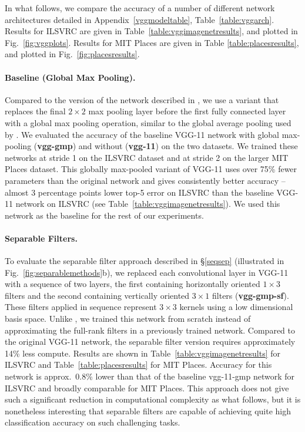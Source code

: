 \documentclass[thesis]{subfiles}
\begin{document}
    In what follows, we compare the accuracy of a number of different network architectures detailed in Appendix~\ref{vggmodeltable}, Table~\ref{table:vggarch}. Results for ILSVRC are given in Table~\ref{table:vggimagenetresults}, and plotted in Fig.~\ref{fig:vggplots}. Results for MIT Places are given in Table \ref{table:placesresults}, and plotted in Fig.~\ref{fig:placesresults}. 
    
    \paragraph{Baseline (Global Max Pooling).}  Compared to the version of the network described in \citep{Simonyan2014verydeep}, we use a variant that replaces the final $2 \times 2$ max pooling layer before the first fully connected layer with a global max pooling operation, similar to the global average pooling used by \citet{Lin2014,Szegedy2014going}. We evaluated the accuracy of the baseline VGG-11 network with global max-pooling (\textbf{vgg-gmp}) and without (\textbf{vgg-11}) on the two datasets. We trained these networks at stride 1 on the ILSVRC dataset and at stride 2 on the larger MIT Places dataset. This globally max-pooled variant of VGG-11 uses over 75\% fewer parameters than the original network and gives consistently better accuracy -- almost 3 percentage points lower top-5 error on ILSVRC than the baseline VGG-11 network on ILSVRC (see Table~\ref{table:vggimagenetresults}). We used this network as the baseline for the rest of our experiments.
    
    
    \paragraph{Separable Filters.} To evaluate the separable filter approach described in \S \ref{seqsep} (illustrated in Fig.~\ref{fig:separablemethods}b), we replaced each convolutional layer in VGG-11 with a sequence of two layers, the first containing horizontally oriented $1 \times 3$ filters and the second containing vertically oriented $3 \times 1$ filters (\textbf{vgg-gmp-sf}). These filters applied in sequence represent $3 \times 3$ kernels using a low dimensional basis space. Unlike \citet{journals/corr/JaderbergVZ14}, we trained this network from scratch instead of approximating the full-rank filters in a previously trained network. Compared to the original VGG-11 network, the separable filter version requires approximately 14\% less compute. Results are shown in Table~\ref{table:vggimagenetresults} for ILSVRC and Table~\ref{table:placesresults} for MIT Places. Accuracy for this network is approx.~0.8\% lower than that of the baseline vgg-11-gmp network for ILSVRC and broadly comparable for MIT Places. This approach does not give such a significant reduction in computational complexity as what follows, but it is nonetheless interesting that separable  filters are capable of achieving quite high classification accuracy on such challenging tasks.
    
\end{document}
